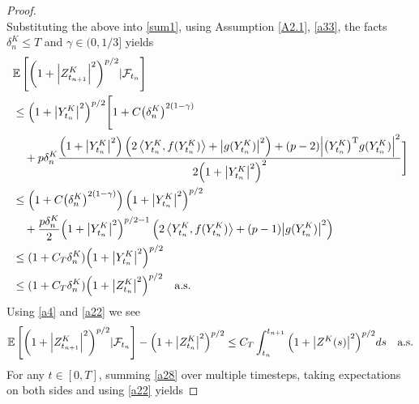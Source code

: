\documentclass[preprint,12pt,compress]{elsarticle}
\begin{document}
\begin{proof}
\begin{equation*}
\end{equation*}
Substituting the above into \eqref{sum1}, using Assumption \ref{A2.1}, \eqref{a33}, the facts $\delta_n^K\le T$ and $\gamma \in (0, 1/3]$ yields
\begin{equation}  \label{a4} 
	\begin{split}
		&\mathbb{E}\left[ {{{\left( {1 + {{\left| {Z_{{t_{n + 1}}}^K} \right|}^2}} \right)}^{p/2}}|{\mathcal{F}_{{t_n}}}} \right] \\
		&\le {\left( {1 + {{\left| {Y_{{t_n}}^K} \right|}^2}} \right)^{p/2}}\Bigg[ {1 + C{{\left( {\delta _n^{K}} \right)}^{2(1 - \gamma )}}}  \\
		&\quad + p\delta _n^K\frac{{\left( {1 + {{\left| {Y_{{t_n}}^K} \right|}^2}} \right)\left( {2\left\langle {Y_{{t_n}}^K,f(Y_{{t_n}}^K)} \right\rangle  + {{\left| {g(Y_{{t_n}}^K)} \right|}^2}} \right) + (p - 2){{\left| {{{\left( {Y_{{t_n}}^K} \right)}^{\rm T}}g(Y_{{t_n}}^K)} \right|}^2}}}{{2{{\left( {1 + {{\left| {Y_{{t_n}}^K} \right|}^2}} \right)}^2}}} \Bigg] \\
		&\le \left( {1 + C{{\left( {\delta _n^{K}} \right)}^{2(1-\gamma)}}} \right){\left( {1 + {{\left| {Y_{{t_n}}^K} \right|}^2}} \right)^{p/2}} \\
		& \quad + \frac{{p{\delta _n^{K}}}}{2}{\left( {1 + {{\left| {Y_{{t_n}}^K} \right|}^2}} \right)^{p/2 - 1}}\left( {2\left\langle {Y_{{t_n}}^K,f(Y_{{t_n}}^K)} \right\rangle  + (p - 1){{\left| {g(Y_{{t_n}}^K)} \right|}^2}} \right) \\
		&\le (1 + C_T{\delta _n^{K}}){\left( {1 + {{\left| {Y_{{t_n}}^K} \right|}^2}} \right)^{p/2}} \\
		&\le (1 + C_T{\delta _n^{K}}){\left( {1 + {{\left| {Z_{{t_n}}^K} \right|}^2}} \right)^{p/2}} \quad \text{a.s.}
	\end{split}
\end{equation}
Using \eqref{a4} and \eqref{a22} we see 
\begin{equation}  \label{a28}
\begin{split}
	\mathbb{E}\left[ {{{\left( {1 + {{\left| {Z_{{t_{n + 1}}}^K} \right|}^2}} \right)}^{p/2}}|{{\cal F}_{{t_n}}}} \right] - {\left( {1 + {{\left| {Z_{{t_n}}^K} \right|}^2}} \right)^{p/2}} \le {C_T}\int_{{t_n}}^{{t_{n + 1}}} {{{\left( {1 + {{\left| {{Z^K}(s)} \right|}^2}} \right)}^{p/2}}ds}   \quad \text{a.s.}
\end{split}
\end{equation}
For any $t \in [0, T]$,
summing \eqref{a28} over multiple timesteps, taking expectations on both sides and using \eqref{a22} yields

\end{proof}
\end{document}
